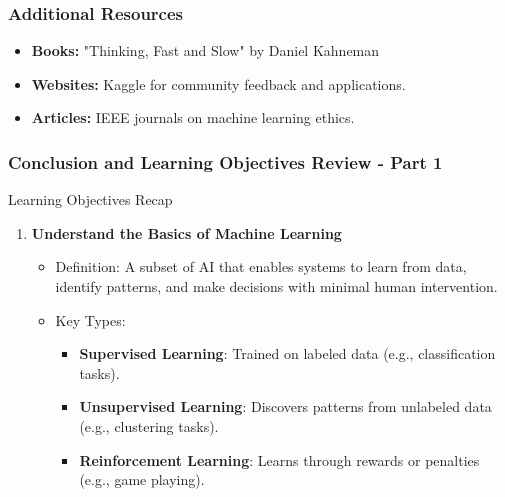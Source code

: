 \documentclass[aspectratio=169]{beamer}
\begin{document}
\begin{frame}[fragile]
    \frametitle{Additional Resources}
    \begin{itemize}
        \item \textbf{Books:} "Thinking, Fast and Slow" by Daniel Kahneman
        \item \textbf{Websites:} Kaggle for community feedback and applications.
        \item \textbf{Articles:} IEEE journals on machine learning ethics.
    \end{itemize}
\end{frame}

\begin{frame}[fragile]
    \frametitle{Conclusion and Learning Objectives Review - Part 1}
    \begin{block}{Learning Objectives Recap}
        \begin{enumerate}
            \item \textbf{Understand the Basics of Machine Learning} 
            \begin{itemize}
                \item Definition: A subset of AI that enables systems to learn from data, identify patterns, and make decisions with minimal human intervention.
                \item Key Types: 
                \begin{itemize}
                    \item \textbf{Supervised Learning}: Trained on labeled data (e.g., classification tasks).
                    \item \textbf{Unsupervised Learning}: Discovers patterns from unlabeled data (e.g., clustering tasks).
                    \item \textbf{Reinforcement Learning}: Learns through rewards or penalties (e.g., game playing).
                \end{itemize}
            \end{itemize}
        \end{enumerate}
    \end{block}
\end{frame}
\end{document}
